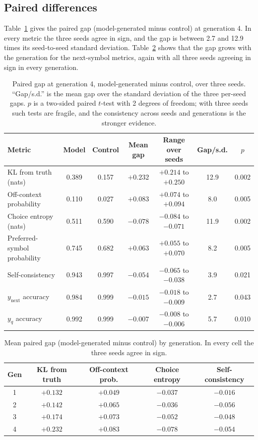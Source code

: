 \documentclass[11pt,a4paper]{article}
\begin{document}
\subsection{Paired differences}
Table~\ref{tab:gaps} gives the paired gap (model-generated minus control)
at generation 4. In every metric the three seeds agree in sign, and the gap is
between 2.7 and 12.9 times its seed-to-seed standard deviation.
Table~\ref{tab:gapgen} shows that the gap grows with the generation for the
next-symbol metrics, again with all three seeds agreeing in sign in every
generation.

\begin{table}[htbp]
\centering
\small
\setlength{\tabcolsep}{4pt}
\caption{Paired gap at generation 4, model-generated minus control, over three
seeds. ``Gap/s.d.'' is the mean gap over the standard deviation of the three
per-seed gaps. $p$ is a two-sided paired $t$-test with 2 degrees of freedom;
with three seeds such tests are fragile, and the consistency across seeds and
generations is the stronger evidence.}
\label{tab:gaps}
\begin{tabular}{lcccccc}
\toprule
Metric & Model & Control & Mean gap & Range over seeds & Gap/s.d. & $p$\\
\midrule
KL from truth (nats) & 0.389 & 0.157 & $+0.232$ & $+0.214$ to $+0.250$ & 12.9 & 0.002 \\
Off-context probability & 0.110 & 0.027 & $+0.083$ & $+0.074$ to $+0.094$ & 8.0 & 0.005 \\
Choice entropy (nats) & 0.511 & 0.590 & $-0.078$ & $-0.084$ to $-0.071$ & 11.9 & 0.002 \\
Preferred-symbol probability & 0.745 & 0.682 & $+0.063$ & $+0.055$ to $+0.070$ & 8.2 & 0.005 \\
Self-consistency & 0.943 & 0.997 & $-0.054$ & $-0.065$ to $-0.038$ & 3.9 & 0.021 \\
$y_{\text{next}}$ accuracy & 0.984 & 0.999 & $-0.015$ & $-0.018$ to $-0.009$ & 2.7 & 0.043 \\
$y_q$ accuracy & 0.992 & 0.999 & $-0.007$ & $-0.008$ to $-0.006$ & 5.7 & 0.010 \\
\bottomrule
\end{tabular}
\end{table}

\begin{table}[htbp]
\centering
\small
\caption{Mean paired gap (model-generated minus control) by generation. In
every cell the three seeds agree in sign.}
\label{tab:gapgen}
\begin{tabular}{ccccc}
\toprule
Gen & KL from truth & Off-context prob. & Choice entropy & Self-consistency\\
\midrule
1 & $+0.132$ & $+0.049$ & $-0.037$ & $-0.016$ \\
2 & $+0.142$ & $+0.065$ & $-0.036$ & $-0.056$ \\
3 & $+0.174$ & $+0.073$ & $-0.052$ & $-0.048$ \\
4 & $+0.232$ & $+0.083$ & $-0.078$ & $-0.054$ \\
\bottomrule
\end{tabular}
\end{table}
\end{document}
